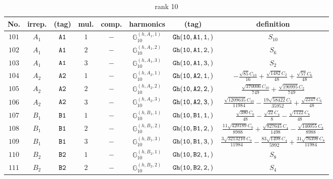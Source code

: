 \documentclass[fleqn,8pt]{jsarticle}
\begin{document}
\begin{table}[ht!]
\begin{center}
\caption{rank 10}
\renewcommand{\arraystretch}{1.3}
\begin{tabular}{cccccccc} \hline \hline
No. & irrep. & (tag) & mul. & comp. & harmonics & (tag) & definition \\ \hline
$ 101 $ & $ A_{1} $ & $ {\tt A1} $ & $ 1 $ & $ - $ & $ \mathbb{G}_{10}^{(h,A_{1},1)} $ & $ {\tt Gh(10,A1,1,)} $ & $ S_{10} $ \\
$ 102 $ & $ A_{1} $ & $ {\tt A1} $ & $ 2 $ & $ - $ & $ \mathbb{G}_{10}^{(h,A_{1},2)} $ & $ {\tt Gh(10,A1,2,)} $ & $ S_{6} $ \\
$ 103 $ & $ A_{1} $ & $ {\tt A1} $ & $ 3 $ & $ - $ & $ \mathbb{G}_{10}^{(h,A_{1},3)} $ & $ {\tt Gh(10,A1,3,)} $ & $ S_{2} $ \\
$ 104 $ & $ A_{2} $ & $ {\tt A2} $ & $ 1 $ & $ - $ & $ \mathbb{G}_{10}^{(h,A_{2},1)} $ & $ {\tt Gh(10,A2,1,)} $ & $ - \frac{\sqrt{85} C_{10}}{16} + \frac{\sqrt{1482} C_{2}}{48} + \frac{\sqrt{57} C_{6}}{48} $ \\
$ 105 $ & $ A_{2} $ & $ {\tt A2} $ & $ 2 $ & $ - $ & $ \mathbb{G}_{10}^{(h,A_{2},2)} $ & $ {\tt Gh(10,A2,2,)} $ & $ \frac{\sqrt{370006} C_{10}}{749} + \frac{\sqrt{190995} C_{2}}{749} $ \\
$ 106 $ & $ A_{2} $ & $ {\tt A2} $ & $ 3 $ & $ - $ & $ \mathbb{G}_{10}^{(h,A_{2},3)} $ & $ {\tt Gh(10,A2,3,)} $ & $ \frac{\sqrt{1209635} C_{10}}{11984} - \frac{19 \sqrt{58422} C_{2}}{35952} + \frac{\sqrt{2247} C_{6}}{48} $ \\
$ 107 $ & $ B_{1} $ & $ {\tt B1} $ & $ 1 $ & $ - $ & $ \mathbb{G}_{10}^{(h,B_{1},1)} $ & $ {\tt Gh(10,B1,1,)} $ & $ \frac{\sqrt{390} C_{0}}{48} - \frac{\sqrt{22} C_{4}}{8} - \frac{\sqrt{1122} C_{8}}{48} $ \\
$ 108 $ & $ B_{1} $ & $ {\tt B1} $ & $ 2 $ & $ - $ & $ \mathbb{G}_{10}^{(h,B_{1},2)} $ & $ {\tt Gh(10,B1,2,)} $ & $ \frac{11 \sqrt{420189} C_{0}}{8988} + \frac{\sqrt{827645} C_{4}}{1498} - \frac{\sqrt{146055} C_{8}}{8988} $ \\
$ 109 $ & $ B_{1} $ & $ {\tt B1} $ & $ 3 $ & $ - $ & $ \mathbb{G}_{10}^{(h,B_{1},3)} $ & $ {\tt Gh(10,B1,3,)} $ & $ \frac{3 \sqrt{3213210} C_{0}}{11984} - \frac{83 \sqrt{1498} C_{4}}{5992} + \frac{31 \sqrt{76398} C_{8}}{11984} $ \\
$ 110 $ & $ B_{2} $ & $ {\tt B2} $ & $ 1 $ & $ - $ & $ \mathbb{G}_{10}^{(h,B_{2},1)} $ & $ {\tt Gh(10,B2,1,)} $ & $ S_{8} $ \\
$ 111 $ & $ B_{2} $ & $ {\tt B2} $ & $ 2 $ & $ - $ & $ \mathbb{G}_{10}^{(h,B_{2},2)} $ & $ {\tt Gh(10,B2,2,)} $ & $ S_{4} $ \\

\end{tabular}
\end{center}
\end{table}
\end{document}
